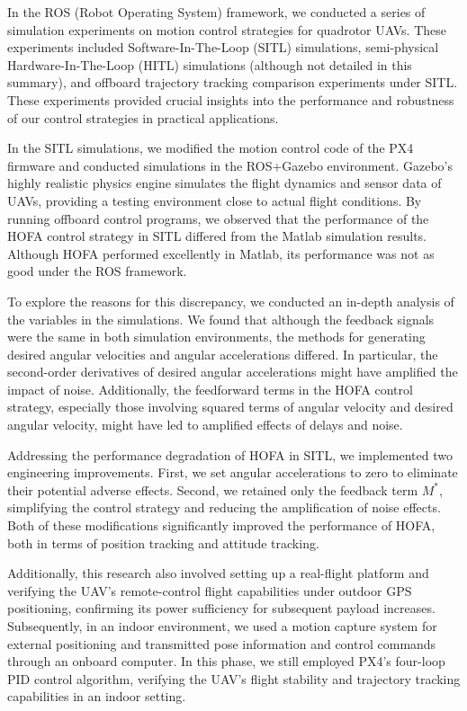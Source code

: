 \begin{digest}
  In the ROS (Robot Operating System) framework, we conducted a series of simulation experiments on motion control strategies for quadrotor UAVs. These experiments included Software-In-The-Loop (SITL) simulations, semi-physical Hardware-In-The-Loop (HITL) simulations (although not detailed in this summary), and offboard trajectory tracking comparison experiments under SITL. These experiments provided crucial insights into the performance and robustness of our control strategies in practical applications.

In the SITL simulations, we modified the motion control code of the PX4 firmware and conducted simulations in the ROS+Gazebo environment. Gazebo's highly realistic physics engine simulates the flight dynamics and sensor data of UAVs, providing a testing environment close to actual flight conditions. By running offboard control programs, we observed that the performance of the HOFA control strategy in SITL differed from the Matlab simulation results. Although HOFA performed excellently in Matlab, its performance was not as good under the ROS framework.

To explore the reasons for this discrepancy, we conducted an in-depth analysis of the variables in the simulations. We found that although the feedback signals were the same in both simulation environments, the methods for generating desired angular velocities and angular accelerations differed. In particular, the second-order derivatives of desired angular accelerations might have amplified the impact of noise. Additionally, the feedforward terms in the HOFA control strategy, especially those involving squared terms of angular velocity and desired angular velocity, might have led to amplified effects of delays and noise.

Addressing the performance degradation of HOFA in SITL, we implemented two engineering improvements. First, we set angular accelerations to zero to eliminate their potential adverse effects. Second, we retained only the feedback term \(M^*\), simplifying the control strategy and reducing the amplification of noise effects. Both of these modifications significantly improved the performance of HOFA, both in terms of position tracking and attitude tracking.

Additionally, this research also involved setting up a real-flight platform and verifying the UAV's remote-control flight capabilities under outdoor GPS positioning, confirming its power sufficiency for subsequent payload increases. Subsequently, in an indoor environment, we used a motion capture system for external positioning and transmitted pose information and control commands through an onboard computer. In this phase, we still employed PX4's four-loop PID control algorithm, verifying the UAV's flight stability and trajectory tracking capabilities in an indoor setting.


\end{digest}

